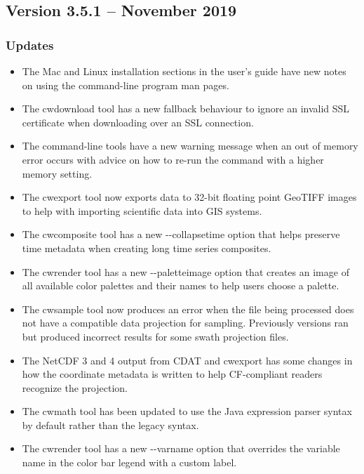 
\subsection*{Version 3.5.1 -- November 2019}

\subsubsection*{ Updates}

\begin{itemize}

  \item The Mac and Linux installation sections in the user's guide have
  new notes on using the command-line program man pages.
  
  \item The cwdownload tool has a new fallback behaviour to ignore an invalid
  SSL certificate when downloading over an SSL connection.
  
  \item The command-line tools have a new warning message when an out of
  memory error occurs with advice on how to re-run the command with a higher
  memory setting.
  
  \item The cwexport tool now exports data to 32-bit floating point GeoTIFF
  images to help with importing scientific data into GIS systems.
  
  \item The cwcomposite tool has a new  -{-}collapsetime option that helps
  preserve time metadata when creating long time series composites.
  
  \item The cwrender tool has a new -{-}paletteimage option that creates an
  image of all available color palettes and their names to help users choose a
  palette.
  
  \item The cwsample tool now produces an error when the file being processed
  does not have a compatible data projection for sampling.  Previously versions
  ran but produced incorrect results for some swath projection files.
  
  \item The NetCDF 3 and 4 output from CDAT and cwexport has some changes in how
  the coordinate metadata is written to help CF-compliant readers recognize
  the projection.
  
  \item The cwmath tool has been updated to use the Java expression parser
  syntax by default rather than the legacy syntax.
  
  \item The cwrender tool has a new -{-}varname option that overrides the
  variable name in the color bar legend with a custom label.

\end{itemize}


